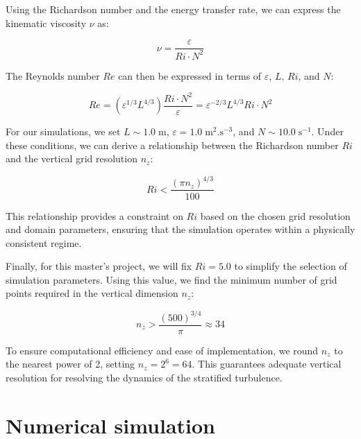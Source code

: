 \documentclass[final,5p,times,twocolumn,authoryear]{elsarticle}
\begin{document}
Using the Richardson number and the energy transfer rate, we can express the kinematic viscosity $\nu$ as:

\begin{equation*}
\nu = \frac{\varepsilon}{Ri \cdot N^2}
\end{equation*}

The Reynolds number $Re$ can then be expressed in terms of $\varepsilon$, $L$, $Ri$, and $N$:

\begin{equation}
Re = \left(\varepsilon^{1/3} L^{4/3} \right) \frac{Ri \cdot N^2}{\varepsilon} = \varepsilon^{-2/3} L^{4/3} Ri \cdot N^2
\end{equation}

For our simulations, we set $L \sim 1.0 \; \mathrm{m}$, $\varepsilon = 1.0 \; \mathrm{m^2.s^{-3}}$, and $N \sim 10.0 \; \mathrm{s^{-1}}$. Under these conditions, we can derive a relationship between the Richardson number $Ri$ and the vertical grid resolution $n_z$:

\begin{equation}
Ri < \frac{\left(\pi n_z\right)^{4/3}}{100}
\end{equation}

This relationship provides a constraint on $Ri$ based on the chosen grid resolution and domain parameters, ensuring that the simulation operates within a physically consistent regime.

Finally, for this master’s project, we will fix $Ri = 5.0$ to simplify the selection of simulation parameters. Using this value, we find the minimum number of grid points required in the vertical dimension $n_z$:

\begin{equation*}
n_z > \frac{\left(500\right)^{3/4}}{\pi} \approx 34
\end{equation*}

To ensure computational efficiency and ease of implementation, we round $n_z$ to the nearest power of 2, setting $n_z = 2^6 = 64$. This guarantees adequate vertical resolution for resolving the dynamics of the stratified turbulence.

\section{Numerical simulation}

\end{document}
